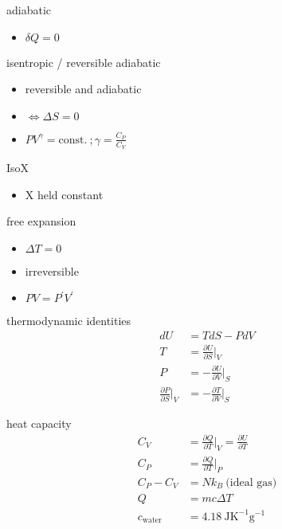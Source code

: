 \documentclass[avery5388, frame, grid]{flashcards}
\begin{document}
\begin{flashcard}{adiabatic}
  \begin{itemize}
  \item $\delta Q = 0$
  \end{itemize}
\end{flashcard}

\begin{flashcard}{isentropic / reversible adiabatic}
  \begin{itemize}
  \item reversible and adiabatic
  \item $\iff \Delta S = 0$
  \item $PV^{\gamma} = \textrm{const.} \ ; \gamma = \frac{C_{P}}{C_{V}}$
  \end{itemize}
\end{flashcard}

\begin{flashcard}{IsoX}
  \begin{itemize}
  \item X held constant
  \end{itemize}
\end{flashcard}

\begin{flashcard}{free expansion}
  \begin{itemize}
  \item $\Delta T = 0$
  \item irreversible
  \item $P V = P^{'} V^{'}$
  \end{itemize}
\end{flashcard}

\begin{flashcard}{thermodynamic identities}
  {
    \begin{align*}
      dU &= T dS - P dV\\
      T &= \frac{\partial U}{\partial S} \rvert_{V}\\
      P & = - \frac{\partial U}{\partial V} \rvert_{S}\\
      \frac{\partial P}{\partial S} \rvert_{V} &= - \frac{\partial T}{\partial V} \rvert_{S}
    \end{align*}
  }
\end{flashcard}

\begin{flashcard}{heat capacity}
  {
    \begin{align*}
      C_{V} &= \frac{\partial Q}{\partial T} \rvert_{V} = \frac{\partial U}{\partial T}\\
      C_{P} &= \frac{\partial Q}{\partial T} \rvert_{P}\\
      C_{P} - C_{V} &= N k_{B} \ \textrm{(ideal gas)}\\
      Q &= m c \Delta T\\
      c_{\textrm{water}} &= 4.18 \ \textrm{J} \textrm{K}^{-1} \textrm{g}^{-1}
    \end{align*}
  }
\end{flashcard}
\end{document}
